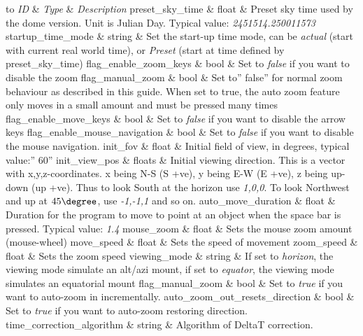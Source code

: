 \begin{longtabu} to \textwidth {l|l|X}
\toprule
\emph{ID} & \emph{Type} & \emph{Description}\tabularnewline
\midrule
preset\_sky\_time & float & Preset sky time used by the
dome version. Unit is Julian Day. Typical value:
\emph{2451514.250011573}\tabularnewline
\midrule
startup\_time\_mode & string & Set the start-up time mode,
can be \emph{actual} (start with current real world time), or
\emph{Preset} (start at time defined by
preset\_sky\_time)\tabularnewline
\midrule
flag\_enable\_zoom\_keys & bool & Set to \emph{false} if
you want to disable the zoom\tabularnewline
\midrule
flag\_manual\_zoom & bool & Set to'' false'' for normal
zoom behaviour as described in this guide. When set to true, the auto
zoom feature only moves in a small amount and must be pressed many
times\tabularnewline
\midrule
flag\_enable\_move\_keys & bool & Set to \emph{false} if
you want to disable the arrow keys\tabularnewline
\midrule
flag\_enable\_mouse\_navigation & bool & Set to
\emph{false} if you want to disable the mouse navigation.\tabularnewline
\midrule
init\_fov & float & Initial field of view, in degrees,
typical value:'' 60''\tabularnewline
\midrule
init\_view\_pos & floats & Initial viewing direction. This
is a vector with x,y,z-coordinates. x being N-S (S +ve), y being E-W (E
+ve), z being up-down (up +ve). Thus to look South at the horizon use
\emph{1,0,0}. To look Northwest and up at $45\degree$, use \emph{-1,-1,1} and so
on.\tabularnewline
\midrule
auto\_move\_duration & float & Duration for the program to
move to point at an object when the space bar is pressed. Typical value:
\emph{1.4}\tabularnewline
\midrule
mouse\_zoom & float & Sets the mouse zoom amount
(mouse-wheel)\tabularnewline
\midrule
move\_speed & float & Sets the speed of
movement\tabularnewline
\midrule
zoom\_speed & float & Sets the zoom speed\tabularnewline
\midrule
viewing\_mode & string & If set to \emph{horizon}, the
viewing mode simulate an alt/azi mount, if set to \emph{equator}, the
viewing mode simulates an equatorial mount\tabularnewline
\midrule
flag\_manual\_zoom & bool & Set to \emph{true} if you want
to auto-zoom in incrementally.\tabularnewline
\midrule
auto\_zoom\_out\_resets\_direction & bool & Set to
\emph{true} if you want to auto-zoom restoring direction.\tabularnewline
\midrule
time\_correction\_algorithm & string & Algorithm of DeltaT
correction.\tabularnewline
\bottomrule
\end{longtabu}

\section{}
\label{sec:Reference:section-plugins-load-at-startup}

